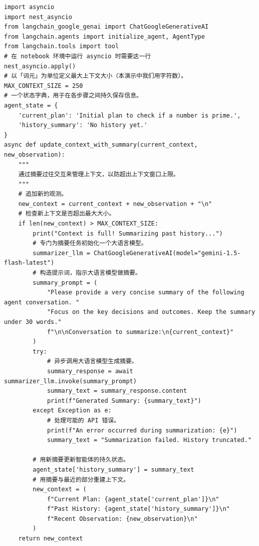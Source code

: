 \begin{listing}
\begin{verbatim}
import asyncio
import nest_asyncio
from langchain_google_genai import ChatGoogleGenerativeAI
from langchain.agents import initialize_agent, AgentType
from langchain.tools import tool
# 在 notebook 环境中运行 asyncio 时需要这一行
nest_asyncio.apply()
# 以「词元」为单位定义最大上下文大小（本演示中我们用字符数）。
MAX_CONTEXT_SIZE = 250
# 一个状态字典，用于在各步骤之间持久保存信息。
agent_state = {
    'current_plan': 'Initial plan to check if a number is prime.',
    'history_summary': 'No history yet.'
}
async def update_context_with_summary(current_context, new_observation):
    """
    通过摘要过往交互来管理上下文，以防超出上下文窗口上限。
    """
    # 追加新的观测。
    new_context = current_context + new_observation + "\n"
    # 检查新上下文是否超出最大大小。
    if len(new_context) > MAX_CONTEXT_SIZE:
        print("Context is full! Summarizing past history...")
        # 专门为摘要任务初始化一个大语言模型。
        summarizer_llm = ChatGoogleGenerativeAI(model="gemini-1.5-flash-latest")
        # 构造提示词，指示大语言模型做摘要。
        summary_prompt = (
            "Please provide a very concise summary of the following agent conversation. "
            "Focus on the key decisions and outcomes. Keep the summary under 30 words."
            f"\n\nConversation to summarize:\n{current_context}"
        )
        try:
            # 异步调用大语言模型生成摘要。
            summary_response = await summarizer_llm.invoke(summary_prompt)
            summary_text = summary_response.content
            print(f"Generated Summary: {summary_text}")
        except Exception as e:
            # 处理可能的 API 错误。
            print(f"An error occurred during summarization: {e}")
            summary_text = "Summarization failed. History truncated."

        # 用新摘要更新智能体的持久状态。
        agent_state['history_summary'] = summary_text
        # 用摘要与最近的部分重建上下文。
        new_context = (
            f"Current Plan: {agent_state['current_plan']}\n"
            f"Past History: {agent_state['history_summary']}\n"
            f"Recent Observation: {new_observation}\n"
        )
    return new_context
\end{verbatim}
    \caption{模型上下文协议的简化实现（第 1 部分）。}\label{lst:MCP1}
\end{listing}
